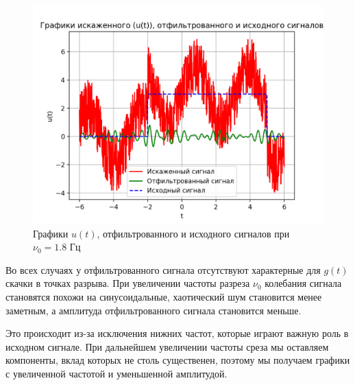 \clearpage

\begin{figure}[ht!]
    \centering
    \includegraphics[scale=0.75]{media/1 task/low_freq/Cleaned_4_2_2_-1,7987987987987988.png}
    \caption{Графики  $u(t)$, отфильтрованного и исходного сигналов при $\nu_0=1.8$ Гц}
    \label{fig:cleaned_4_2_2_1.8}
\end{figure}

Во всех случаях у отфильтрованного сигнала отсутствуют характерные для $g(t)$ скачки в точках разрыва. При увеличении частоты разреза $\nu_0$ колебания сигнала становятся похожи на синусоидальные, хаотический шум становится менее заметным, а амплитуда отфильтрованного сигнала становится меньше. 

Это происходит из-за исключения нижних частот, которые играют важную роль в исходном сигнале. При дальнейшем увеличении частоты среза мы оставляем компоненты, вклад которых не столь существенен, поэтому мы получаем графики с увеличенной частотой и уменьшенной амплитудой. 